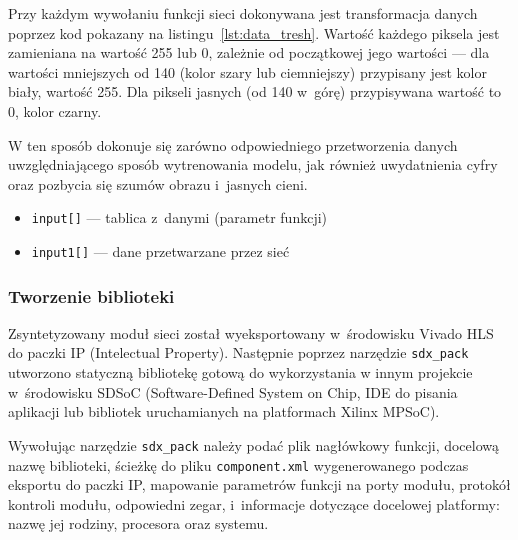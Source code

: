 \documentclass[12pt, oneside, a4paper]{article}
\begin{document}
Przy każdym wywołaniu funkcji sieci dokonywana jest transformacja
danych poprzez kod pokazany na listingu~\ref{lst:data_tresh}.
Wartość każdego piksela jest zamieniana na wartość 255 lub 0, zależnie
od początkowej jego wartości --- dla wartości mniejszych od 140
(kolor szary lub ciemniejszy) przypisany jest kolor biały, wartość 255.
Dla pikseli jasnych (od 140 w~górę) przypisywana wartość to 0, kolor czarny.

W ten sposób dokonuje się zarówno odpowiedniego przetworzenia danych
uwzględniającego sposób wytrenowania modelu, jak również uwydatnienia
cyfry oraz pozbycia się szumów obrazu i~jasnych cieni.

\hspace{-1cm}
\begin{minipage}{\linewidth}

\begin{itemize}
  \setlength{\itemindent}{3em}
  \item \lstinline[style=hls]{input[]} --- tablica z~danymi (parametr funkcji)
  \item \lstinline[style=hls]{input1[]} --- dane przetwarzane przez sieć
\end{itemize}
\end{minipage}

\subsubsection{Tworzenie biblioteki}\label{section:create_library}

Zsyntetyzowany moduł sieci został wyeksportowany w~środowisku Vivado HLS
do paczki IP (Intelectual Property). Następnie poprzez narzędzie
\lstinline{sdx_pack} utworzono statyczną bibliotekę gotową do wykorzystania
w innym projekcie w~środowisku SDSoC (Software-Defined System on Chip,
IDE do pisania aplikacji lub bibliotek uruchamianych na platformach
Xilinx MPSoC).

Wywołując narzędzie \lstinline{sdx_pack} należy podać plik nagłówkowy funkcji,
docelową nazwę biblioteki,
ścieżkę do pliku \lstinline{component.xml} wygenerowanego podczas eksportu
do paczki IP, mapowanie parametrów funkcji na porty modułu,
protokół kontroli modułu, odpowiedni zegar, i~informacje
dotyczące docelowej platformy: nazwę jej rodziny, procesora oraz systemu.

\hspace{1mm}
\begin{minipage}{0.95\linewidth}

\end{minipage}
\end{document}
